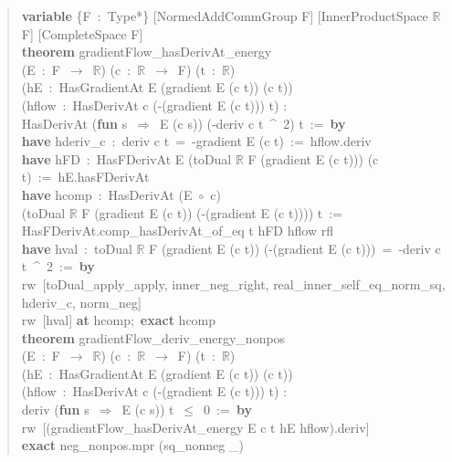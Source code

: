 \begin{quote}\small\ttfamily\raggedright
\textbf{variable} \{F~:~Type*\} [NormedAddCommGroup F] [InnerProductSpace $\mathbb{R}$ F] [CompleteSpace F]\\[6pt]
\textbf{theorem} gradientFlow\_hasDerivAt\_energy\\
\phantom{xx}(E~:~F~$\to$~$\mathbb{R}$) (c~:~$\mathbb{R}$~$\to$~F) (t~:~$\mathbb{R}$)\\
\phantom{xx}(hE~:~HasGradientAt E (gradient E (c t)) (c t))\\
\phantom{xx}(hflow~:~HasDerivAt c (-(gradient E (c t))) t) :\\
\phantom{xx}HasDerivAt (\textbf{fun} s~$\Rightarrow$~E (c s)) (-\textbar\textbar deriv c t\textbar\textbar~\^{}~2) t~:=~\textbf{by}\\
\phantom{xx}\textbf{have} hderiv\_c~:~deriv c t~=~-gradient E (c t)~:=~hflow.deriv\\
\phantom{xx}\textbf{have} hFD~:~HasFDerivAt E (toDual $\mathbb{R}$ F (gradient E (c t))) (c t)~:=~hE.hasFDerivAt\\
\phantom{xx}\textbf{have} hcomp~:~HasDerivAt (E~$\circ$~c)\\
\phantom{xxxx}(toDual $\mathbb{R}$ F (gradient E (c t)) (-(gradient E (c t)))) t~:=\\
\phantom{xxxx}HasFDerivAt.comp\_hasDerivAt\_of\_eq t hFD hflow rfl\\
\phantom{xx}\textbf{have} hval~:~toDual $\mathbb{R}$ F (gradient E (c t)) (-(gradient E (c t)))~=~-\textbar\textbar deriv c t\textbar\textbar~\^{}~2~:=~\textbf{by}\\
\phantom{xxxx}rw~[toDual\_apply\_apply, inner\_neg\_right, real\_inner\_self\_eq\_norm\_sq, hderiv\_c, norm\_neg]\\
\phantom{xx}rw~[hval] \textbf{at} hcomp;~\textbf{exact} hcomp\\[6pt]
\textbf{theorem} gradientFlow\_deriv\_energy\_nonpos\\
\phantom{xx}(E~:~F~$\to$~$\mathbb{R}$) (c~:~$\mathbb{R}$~$\to$~F) (t~:~$\mathbb{R}$)\\
\phantom{xx}(hE~:~HasGradientAt E (gradient E (c t)) (c t))\\
\phantom{xx}(hflow~:~HasDerivAt c (-(gradient E (c t))) t) :\\
\phantom{xx}deriv (\textbf{fun} s~$\Rightarrow$~E (c s)) t~$\le$~0~:=~\textbf{by}\\
\phantom{xx}rw~[(gradientFlow\_hasDerivAt\_energy E c t hE hflow).deriv]\\
\phantom{xx}\textbf{exact} neg\_nonpos.mpr (sq\_nonneg \_)
\end{quote}

